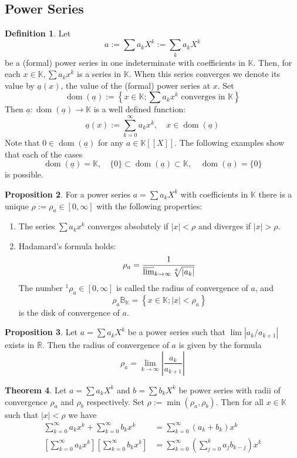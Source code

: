 \documentclass[12pt,a4paper]{book}
\newenvironment{enu}{\begin{enumerate}[(1)]}{\end{enumerate}}
\theoremstyle{definition}
\newtheorem{defn}{Definition}[section]
\newtheorem{theo}[defn]{Theorem}
\newtheorem{prop}[defn]{Proposition}
\begin{document}
\subsection{Power Series}
\begin{defn}
    Let
    $$
    a:=\sum a_k X^k:=\sum_k a_k X^k
    $$
    be a (formal) power series in one indeterminate with coefficients in $\mathbb{K}$. Then, for each $x \in \mathbb{K}, \sum a_k x^k$ is a series in $\mathbb{K}$. When this series converges we denote its value by $\underline{a}(x)$, the value of the (formal) power series  at $x$. Set
    $$
    \operatorname{dom}(\underline{a}):=\left\{x \in \mathbb{K} ; \sum a_k x^k \text { converges in } \mathbb{K}\right\}
    $$
    Then $\underline{a}: \operatorname{dom}(\underline{a}) \rightarrow \mathbb{K}$ is a well defined function:
    $$
    \underline{a}(x):=\sum_{k=0}^{\infty} a_k x^k, \quad x \in \operatorname{dom}(\underline{a})
    $$
    Note that $0 \in \operatorname{dom}(\underline{a})$ for any $a \in \mathbb{K}[[X]]$. The following examples show that each of the cases
    $$
    \operatorname{dom}(\underline{a})=\mathbb{K}, \quad\{0\} \subset \operatorname{dom}(\underline{a}) \subset \mathbb{K}, \quad \operatorname{dom}(\underline{a})=\{0\}
    $$
    is possible.
\end{defn}
\begin{prop}
    For a power series $a=\sum a_k X^k$ with coefficients in $\mathbb{K}$ there is a unique $\rho:=\rho_a \in[0, \infty]$ with the following properties:
\begin{enu}
    \item The series $\sum a_k x^k$ converges absolutely if $|x|<\rho$ and diverges if $|x|>\rho$.
    \item Hadamard's formula holds:
    $$
    \rho_a=\frac{1}{\varlimsup_{k \rightarrow \infty} \sqrt[k]{\left|a_k\right|}}
    $$
    The number ${ }^1 \rho_a \in[0, \infty]$ is called the radius of convergence of $a$, and
    $$
    \rho_a \mathbb{B}_{\mathbb{K}}=\left\{x \in \mathbb{K} ;|x|<\rho_a\right\}
    $$
    is the disk of convergence of $a$.
\end{enu} 
\end{prop}
\begin{prop}
   Let $a=\sum a_k X^k$ be a power series such that $\lim \left|a_k / a_{k+1}\right|$ exists in $\overline{\mathbb{R}}$. Then the radius of convergence of $a$ is given by the formula
    $$
    \rho_a=\lim _{k \rightarrow \infty}\left|\frac{a_k}{a_{k+1}}\right|
    $$
\end{prop}
\begin{theo}
    Let $a=\sum a_k X^k$ and $b=\sum b_k X^k$ be power series with radii of convergence $\rho_a$ and $\rho_b$ respectively. Set $\rho:=\min \left(\rho_a, \rho_b\right)$. Then for all $x \in \mathbb{K}$ such that $|x|<\rho$ we have
    $$
    \begin{aligned}
    \sum_{k=0}^{\infty} a_k x^k+\sum_{k=0}^{\infty} b_k x^k & =\sum_{k=0}^{\infty}\left(a_k+b_k\right) x^k \\
    {\left[\sum_{k=0}^{\infty} a_k x^k\right]\left[\sum_{k=0}^{\infty} b_k x^k\right] } & =\sum_{k=0}^{\infty}\left(\sum_{j=0}^k a_j b_{k-j}\right) x^k
    \end{aligned}
    $$
\end{theo}
\end{document}
